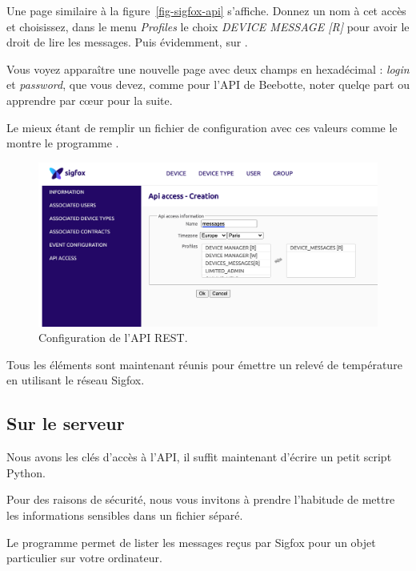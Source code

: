 Une page similaire à la figure~\vref{fig-sigfox-api} s'affiche. Donnez un nom à cet accès et choisissez, dans le menu \textit{Profiles} le choix \textit{DEVICE MESSAGE [R]} pour avoir le droit de lire les messages. Puis évidemment, sur .

     \vspace{1em}

Vous voyez apparaître une nouvelle page avec deux champs en hexadécimal : \textit{login} et \textit{password}, que vous devez, comme pour l'API de Beebotte, noter quelqe part ou apprendre par cœur pour la suite.

Le mieux étant de remplir un fichier de configuration avec ces valeurs comme le montre le programme .



\begin{figure}[tbp]
\centerline{\includegraphics[width=1\columnwidth]{Pictures/sigfox-api-access.png} }
\caption{Configuration de l'API REST.}
\label{fig-sigfox-api}
\end{figure}

     \vspace{1em}

Tous les éléments sont maintenant réunis pour émettre un relevé de température en utilisant le réseau Sigfox. 

\subsection{Sur le serveur}
Nous avons les clés d’accès à l’API, il suffit maintenant d’écrire un petit script Python.

Pour des raisons de sécurité, nous vous invitons à prendre l'habitude de mettre les informations sensibles dans un fichier séparé.

Le programme  permet de lister les messages reçus par Sigfox pour un objet particulier sur votre ordinateur.

